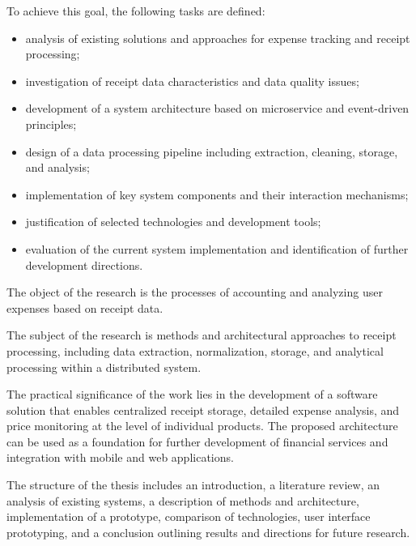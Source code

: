 To achieve this goal, the following tasks are defined:

\begin{itemize}
    \item analysis of existing solutions and approaches for expense tracking and receipt processing;
    \item investigation of receipt data characteristics and data quality issues;
    \item development of a system architecture based on microservice and event-driven principles;
    \item design of a data processing pipeline including extraction, cleaning, storage, and analysis;
    \item implementation of key system components and their interaction mechanisms;
    \item justification of selected technologies and development tools;
    \item evaluation of the current system implementation and identification of further development directions.
\end{itemize}

The object of the research is the processes of accounting and analyzing user expenses based on receipt data.

The subject of the research is methods and architectural approaches to receipt processing, including data extraction, normalization, storage, and analytical processing within a distributed system.

The practical significance of the work lies in the development of a software solution that enables centralized receipt storage, detailed expense analysis, and price monitoring at the level of individual products. The proposed architecture can be used as a foundation for further development of financial services and integration with mobile and web applications.

The structure of the thesis includes an introduction, a literature review, an analysis of existing systems, a description of methods and architecture, implementation of a prototype, comparison of technologies, user interface prototyping, and a conclusion outlining results and directions for future research.